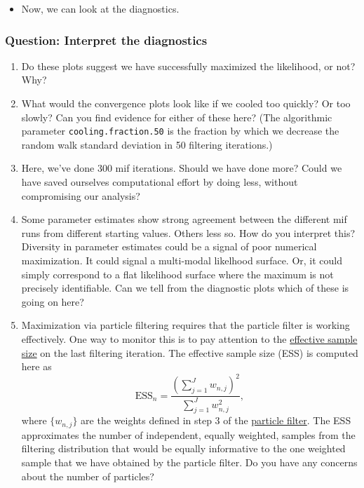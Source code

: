 \documentclass[]{article}
\providecommand{\tightlist}{%
  \setlength{\itemsep}{0pt}\setlength{\parskip}{0pt}}
\begin{document}
\begin{itemize}
\tightlist
\item
  Now, we can look at the diagnostics.
\end{itemize}

\subsubsection{Question: Interpret the
diagnostics}\label{question-interpret-the-diagnostics}

\begin{enumerate}
\def\labelenumi{\arabic{enumi}.}
\item
  Do these plots suggest we have successfully maximized the likelihood,
  or not? Why?
\item
  What would the convergence plots look like if we cooled too quickly?
  Or too slowly? Can you find evidence for either of these here? (The
  algorithmic parameter \texttt{cooling.fraction.50} is the fraction by
  which we decrease the random walk standard deviation in 50 filtering
  iterations.)
\item
  Here, we've done 300 mif iterations. Should we have done more? Could
  we have saved ourselves computational effort by doing less, without
  compromising our analysis?
\item
  Some parameter estimates show strong agreement between the different
  mif runs from different starting values. Others less so. How do you
  interpret this? Diversity in parameter estimates could be a signal of
  poor numerical maximization. It could signal a multi-modal likelhood
  surface. Or, it could simply correspond to a flat likelihood surface
  where the maximum is not precisely identifiable. Can we tell from the
  diagnostic plots which of these is going on here?
\item
  Maximization via particle filtering requires that the particle filter
  is working effectively. One way to monitor this is to pay attention to
  the
  \href{https://en.wikipedia.org/wiki/Effective_sample_size}{effective
  sample size} on the last filtering iteration. The effective sample
  size (ESS) is computed here as
  \[ \mathrm{ESS}_{n}= \frac{\left(\sum_{j=1}^J w_{n,j}\right)^2}{\sum_{j=1}^J w_{n,j}^2},\]
  where \(\{w_{n,j}\}\) are the weights defined in step 3 of the
  \protect\hyperlink{the-particle-filter}{particle filter}. The ESS
  approximates the number of independent, equally weighted, samples from
  the filtering distribution that would be equally informative to the
  one weighted sample that we have obtained by the particle filter. Do
  you have any concerns about the number of particles? 
\end{enumerate}
\end{document}
